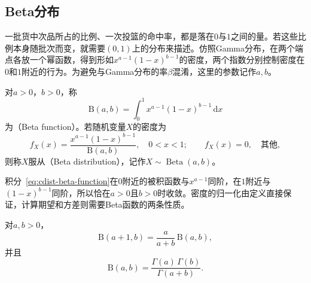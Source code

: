 \subsection{Beta分布}
\label{sec:cdist-beta}

一批货中次品所占的比例、一次投篮的命中率，都是落在$0$与$1$之间的量。若这些比例本身随批次而变，就需要$(0,1)$上的分布来描述。仿照Gamma分布，在两个端点各放一个幂函数，得到形如$x^{a-1}(1-x)^{b-1}$的密度，两个指数分别控制密度在$0$和$1$附近的行为。为避免与Gamma分布的率$\beta$混淆，这里的参数记作$a,b$。

\begin{definition}[Beta函数与Beta分布]
\label{def:cdist-beta}
对$a>0$，$b>0$，称
\begin{equation}
  \mathrm{B}(a,b)=\int_0^{1}x^{a-1}(1-x)^{b-1}\,\mathrm{d}x
  \label{eq:cdist-beta-function}
\end{equation}
为（Beta function）。若随机变量$X$的密度为
\begin{equation}
  f_X(x)=\frac{x^{a-1}(1-x)^{b-1}}{\mathrm{B}(a,b)},\quad 0<x<1;\qquad f_X(x)=0,\quad\text{其他},
  \label{eq:cdist-beta-density}
\end{equation}
则称$X$服从（Beta distribution），记作$X\sim\operatorname{Beta}(a,b)$。
\end{definition}

积分~\eqref{eq:cdist-beta-function}在$0$附近的被积函数与$x^{a-1}$同阶，在$1$附近与$(1-x)^{b-1}$同阶，所以恰在$a>0$且$b>0$时收敛。密度的归一化由定义直接保证，计算期望和方差则需要Beta函数的两条性质。

\begin{lemma}[Beta函数的性质]
\label{lem:cdist-beta-function}
对$a,b>0$，
\begin{equation}
  \mathrm{B}(a+1,b)=\frac{a}{a+b}\,\mathrm{B}(a,b),
  \label{eq:cdist-beta-recursion}
\end{equation}
并且
\begin{equation}
  \mathrm{B}(a,b)=\frac{\Gamma(a)\,\Gamma(b)}{\Gamma(a+b)} .
  \label{eq:cdist-beta-gamma}
\end{equation}
\end{lemma}

